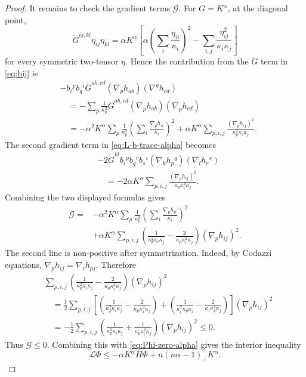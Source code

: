 \documentclass[11pt, reqno]{amsart}
\theoremstyle{remark}
\theoremstyle{definition}
\numberwithin{equation}{section}
\newcommand{\cL}{\mathcal L}
\begin{document}
\begin{proof}
It remains to check the gradient terms $\mathcal G$.  For $G=K^\alpha$, at the diagonal point,
\begin{equation*}
        \ddot G^{ij,kl}\eta_{ij}\eta_{kl}
        =\alpha K^\alpha
        \left[\alpha\left(\sum_i\frac{\eta_{ii}}{\kappa_i}\right)^2
        -\sum_{i,j}\frac{\eta_{ij}^2}{\kappa_i\kappa_j}\right]
\end{equation*}
for every symmetric two-tensor $\eta$.  Hence the contribution from the $\ddot G$ term in \eqref{eq:hij} is
\begin{align*}
 &-b_i{}^p b_q{}^i\ddot G^{ab,cd}
        (\nabla_p h_{ab})(\nabla^q h_{cd})  \\
 &\quad
 =-\sum_p\frac1{\kappa_p^2}\ddot G^{ab,cd}
        (\nabla_p h_{ab})(\nabla_p h_{cd})  \\
 &\quad
 =-\alpha^2K^\alpha\sum_p\frac1{\kappa_p^2}
        \left(\sum_i\frac{\nabla_p h_{ii}}{\kappa_i}\right)^2
   +\alpha K^\alpha\sum_{p,i,j}
        \frac{(\nabla_p h_{ij})^2}{\kappa_p^2\kappa_i\kappa_j}.
\end{align*}
The second gradient term in \eqref{eq:L-b-trace-alpha} becomes
\begin{align*}
 &-2\dot G^{kl}b_i{}^p b_q{}^r b_s{}^i
        (\nabla_k h_p{}^q)(\nabla_l h_r{}^s)  \\
 &\quad
 =-2\alpha K^\alpha\sum_{p,i,j}
        \frac{(\nabla_p h_{ij})^2}{\kappa_p\kappa_i^2\kappa_j}.
\end{align*}
Combining the two displayed formulas gives
\begin{align*}
\mathcal G
={}&-\alpha^2K^\alpha\sum_p\frac1{\kappa_p^2}
        \left(\sum_i\frac{\nabla_p h_{ii}}{\kappa_i}\right)^2 \\
&+\alpha K^\alpha\sum_{p,i,j}
        \left(\frac1{\kappa_p^2\kappa_i\kappa_j}
        -\frac2{\kappa_p\kappa_i^2\kappa_j}\right)
        (\nabla_p h_{ij})^2 .
\end{align*}
The second line is non-positive after symmetrization.  Indeed, by Codazzi equations,  $\nabla_p h_{ij}=\nabla_i h_{pj}$.  Therefore
\begin{align*}
&\sum_{p,i,j}
        \left(\frac1{\kappa_p^2\kappa_i\kappa_j}
        -\frac2{\kappa_p\kappa_i^2\kappa_j}\right)(\nabla_p h_{ij})^2  \\
&\quad
=\frac12\sum_{p,i,j}
        \left[
        \left(\frac1{\kappa_p^2\kappa_i\kappa_j}
        -\frac2{\kappa_p\kappa_i^2\kappa_j}\right)
        +
        \left(\frac1{\kappa_i^2\kappa_p\kappa_j}
        -\frac2{\kappa_i\kappa_p^2\kappa_j}\right)
        \right](\nabla_p h_{ij})^2  \\
&\quad
=-\frac12\sum_{p,i,j}
        \left(\frac1{\kappa_p^2\kappa_i\kappa_j}
        +\frac1{\kappa_p\kappa_i^2\kappa_j}\right)(\nabla_p h_{ij})^2
\le0.
\end{align*}
Thus $\mathcal G\le0$.  Combining this with \eqref{eq:Phi-zero-alpha} gives the interior inequality
\begin{equation}\label{eq:L-Phi-alpha-detailed}
        \cL\Phi
        \le -\alpha K^\alpha H\Phi+n(n\alpha-1)_+K^\alpha.
\end{equation}


\end{proof}
\end{document}
